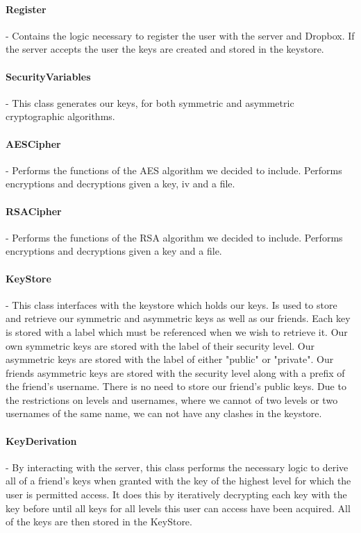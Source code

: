 \documentclass[12pt, titlepage]{article}
\begin{document}
\paragraph*{Register} - Contains the logic necessary to register the user with the server and Dropbox. If the server accepts the user the keys are created and stored in the keystore.
\paragraph*{SecurityVariables} - This class generates our keys, for both symmetric and asymmetric cryptographic algorithms.
\paragraph*{AESCipher} - Performs the functions of the AES algorithm we decided to include. Performs encryptions and decryptions given a key, iv and a file.
\paragraph*{RSACipher} - Performs the functions of the RSA algorithm we decided to include. Performs encryptions and decryptions given a key and a file.
\paragraph*{KeyStore} - This class interfaces with the keystore which holds our keys. Is used to store and retrieve our symmetric and asymmetric keys as well as our friends. Each key is stored with a label which must be referenced when we wish to retrieve it. Our own symmetric keys are stored with the label of their security level. Our asymmetric keys are stored with the label of either "public" or "private". Our friends asymmetric keys are stored with the security level along with a prefix of the friend's username. There is no need to store our friend's public keys. Due to the restrictions on levels and usernames, where we cannot of two levels or two usernames of the same name, we can not have any clashes in the keystore.
\paragraph*{KeyDerivation} - By interacting with the server, this class performs the necessary logic to derive all of a friend's keys when granted with the key of the highest level for which the user is permitted access. It does this by iteratively decrypting each key with the key before until all keys for all levels this user can access have been acquired. All of the keys are then stored in the KeyStore.
\end{document}
